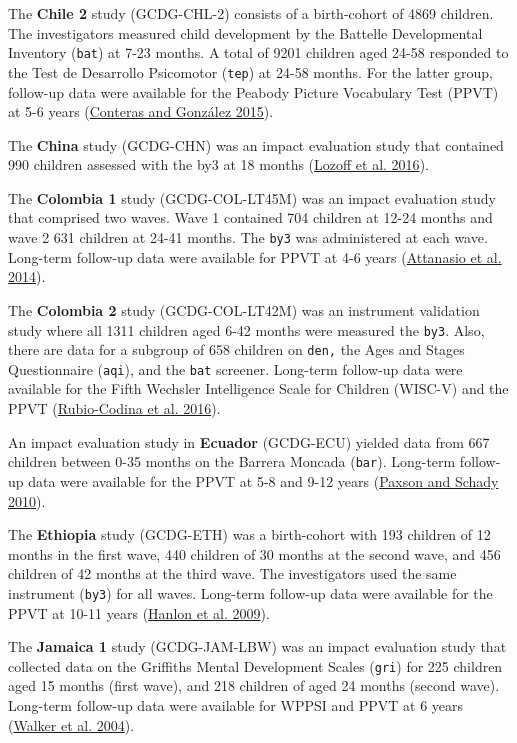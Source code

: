 \documentclass[
]{book}
\begin{document}
The \textbf{Chile 2} study (GCDG-CHL-2) consists of a birth-cohort of 4869 children. The investigators measured child development by the Battelle Developmental Inventory (\texttt{bat}) at 7-23 months. A total of 9201 children aged 24-58 responded to the Test de Desarrollo Psicomotor (\texttt{tep}) at 24-58 months. For the latter group, follow-up data were available for the Peabody Picture Vocabulary Test (PPVT) at 5-6 years (\protect\hyperlink{ref-conteras2015}{Conteras and González 2015}).

The \textbf{China} study (GCDG-CHN) was an impact evaluation study that contained 990 children assessed with the by3 at 18 months (\protect\hyperlink{ref-Lozoff2016}{Lozoff et al. 2016}).

The \textbf{Colombia 1} study (GCDG-COL-LT45M) was an impact evaluation study that comprised two waves. Wave 1 contained 704 children at 12-24 months and wave 2 631 children at 24-41 months. The \texttt{by3} was administered at each wave. Long-term follow-up data were available for PPVT at 4-6 years (\protect\hyperlink{ref-Attanasio2014}{Attanasio et al. 2014}).

The \textbf{Colombia 2} study (GCDG-COL-LT42M) was an instrument validation study where all 1311 children aged 6-42 months were measured the \texttt{by3}. Also, there are data for a subgroup of 658 children on \texttt{den,} the Ages and Stages Questionnaire (\texttt{aqi}), and the \texttt{bat} screener. Long-term follow-up data were available for the Fifth Wechsler Intelligence Scale for Children (WISC-V) and the PPVT (\protect\hyperlink{ref-Rubio-Codina2016}{Rubio-Codina et al. 2016}).

An impact evaluation study in \textbf{Ecuador} (GCDG-ECU) yielded data from 667 children between 0-35 months on the Barrera Moncada (\texttt{bar}). Long-term follow-up data were available for the PPVT at 5-8 and 9-12 years (\protect\hyperlink{ref-Paxson2010}{Paxson and Schady 2010}).

The \textbf{Ethiopia} study (GCDG-ETH) was a birth-cohort with 193 children of 12 months in the first wave, 440 children of 30 months at the second wave, and 456 children of 42 months at the third wave. The investigators used the same instrument (\texttt{by3}) for all waves. Long-term follow-up data were available for the PPVT at 10-11 years (\protect\hyperlink{ref-Hanlon2009}{Hanlon et al. 2009}).

The \textbf{Jamaica 1} study (GCDG-JAM-LBW) was an impact evaluation study that collected data on the Griffiths Mental Development Scales (\texttt{gri}) for 225 children aged 15 months (first wave), and 218 children of aged 24 months (second wave). Long-term follow-up data were available for WPPSI and PPVT at 6 years (\protect\hyperlink{ref-Walker2004}{Walker et al. 2004}).
\end{document}
